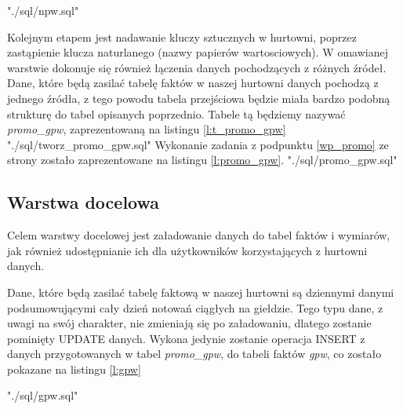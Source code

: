  {"./sql/npw.sql"}  


Kolejnym etapem jest nadawanie kluczy sztucznych w hurtowni, poprzez zastąpienie klucza naturlanego (nazwy papierów wartosciowych).
W omawianej warstwie  dokonuje się również  łączenia danych pochodzących z różnych źródeł.
Dane, które będą zasilać tabelę faktów w naszej hurtowni danych pochodzą z jednego źródła, 
 z tego powodu tabela przejściowa będzie miała bardzo podobną strukturę do tabel opisanych poprzednio.
Tabele tą będziemy nazywać \textit{promo\_gpw}, zaprezentowaną na listingu \ref{l:t_promo_gpw}
 {"./sql/tworz_promo_gpw.sql"} 
Wykonanie zadania z podpunktu  \ref{wp_promo} ze strony \pageref{wp_promo} 
zostało zaprezentowane na listingu \ref{l:promo_gpw}.
 {"./sql/promo_gpw.sql"} 



\subsection{Warstwa docelowa} \label{warstwa_docelowa}
Celem warstwy docelowej jest załadowanie danych do tabel faktów i wymiarów,
 jak również udostępnianie ich dla użytkowników korzystających z hurtowni danych.

Dane, które będą zasilać tabelę faktową w naszej hurtowni są dziennymi danymi podsumowującymi cały dzień notowań ciągłych na giełdzie. 
Tego typu dane, z uwagi na swój charakter, nie zmieniają się po załadowaniu, dlatego
 zostanie pominięty UPDATE danych. Wykona jedynie zostanie operacja INSERT z danych 
 przygotowanych w tabel \textit{promo\_gpw}, do tabeli faktów \textit{gpw}, 
 co zostało pokazane na listingu \ref{l:gpw}

 {"./sql/gpw.sql"} 


